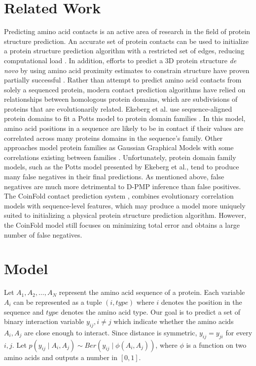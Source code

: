 \documentclass{article}
\begin{document}
\section{Related Work}
Predicting amino acid contacts is an active area of research in the field of protein structure prediction. An accurate set of protein contacts can be used to initialize a protein structure prediction algorithm with a restricted set of edges, reducing computational load \cite{wuyun16}. In addition, efforts to predict a 3D protein structure \emph{de novo} by using amino acid proximity estimates to constrain structure have proven partially successful \cite{colwell11}. Rather than attempt to predict amino acid contacts from solely a sequenced protein, modern contact prediction algorithms have relied on relationships between homologous protein domains, which are subdivisions of proteins that are evolutionarily related. Ekeberg et al. use sequence-aligned protein domains to fit a Potts model to protein domain families \cite{ekeberg13}. In this model, amino acid positions in a sequence are likely to be in contact if their values are correlated across many proteins domains in the sequence's family. Other approaches model protein families as Gaussian Graphical Models with some correlations existing between families \cite{ma15}. Unfortunately, protein domain family models, such as the Potts model presented by Ekeberg et al., tend to produce many false negatives in their final predictions. As mentioned above, false negatives are much more detrimental to D-PMP inference than false positives. The CoinFold contact prediction system \cite{wang16}, combines evolutionary correlation models with sequence-level features, which may produce a model more uniquely suited to initializing a physical protein structure prediction algorithm. However, the CoinFold model still focuses on minimizing total error and obtains a large number of false negatives.


\section{Model}
Let $A_1, A_2, \ldots, A_N$ represent the amino acid sequence of a protein. Each variable $A_i$ can be represented as a tuple $(i, type)$ where $i$ denotes the position in the sequence and $type$ denotes the amino acid type. Our goal is to predict a set of binary interaction variable $y_{ij}, i \neq j$ which indicate whether the amino acids $A_i, A_j$ are close enough to interact. Since distance is symmetric, $y_{ij} = y_{ji}$ for every $i, j$. Let $p(y_{ij} \mid A_i, A_j) \sim Ber(y_{ij} \mid \phi(A_i, A_j))$, where $\phi$ is a function on two amino acids and outputs a number in $[0, 1]$. 
\end{document}
